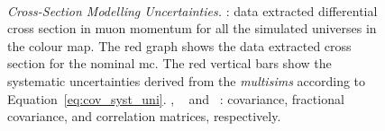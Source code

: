 \begin{figure}[t]
{   \label{fig:genie_multisim_mumom_corr_matrix_2d}} \\
\caption[Cross-Section Modelling Uncertainties - Cross Section in $p_\mu$]{\emph{Cross-Section Modelling Uncertainties.} \protect{}: data extracted differential cross section in muon momentum for all the simulated universes in the colour map. The red graph shows the data extracted cross section for the nominal \acrshort{mc}. The red vertical bars show the \g systematic uncertainties derived from the \emph{multisims} according to Equation~\eqref{eq:cov_syst_uni}. \protect{}, ~\protect{} and ~\protect{}: covariance, fractional covariance, and  correlation matrices, respectively.}
\label{fig:genie_multisim_mumom}
\end{figure}

